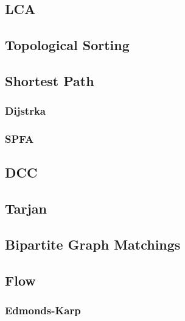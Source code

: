 \documentclass[a4paper]{article}
\begin{document}
\subsection{LCA}


\subsection{Topological Sorting}


\subsection{Shortest Path}

\subsubsection{Dijstrka}


\subsubsection{SPFA}


\subsection{DCC}



\subsection{Tarjan}



\subsection{Bipartite Graph Matchings}



\subsection{Flow}

\subsubsection{Edmonds-Karp}
\end{document}
